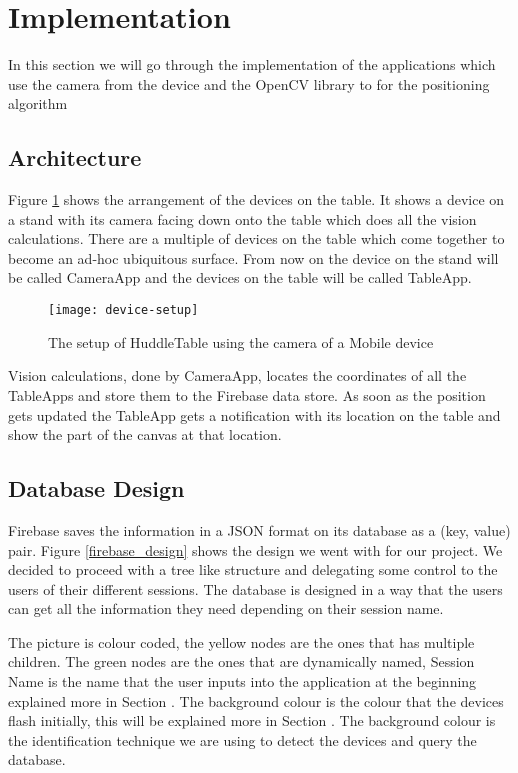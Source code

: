 \section{Implementation}
In this section we will go through the implementation of the applications which use the camera from the device and the OpenCV library to for the positioning algorithm 

\subsection{Architecture}

Figure \ref{fig:device-setup} shows the arrangement of the devices on the table. It shows a device on a stand with its camera facing down onto the table which does all the vision calculations. There are a multiple of devices on the table which come together to become an ad-hoc ubiquitous surface. From now on the device on the stand will be called CameraApp and the devices on the table will be called TableApp.
\begin{figure}[H]
\centering
\texttt{[image: device-setup]}
\caption{The setup of HuddleTable using the camera of a Mobile device}
\label{fig:device-setup}
\end{figure}


Vision calculations, done by CameraApp, locates the coordinates of all the TableApps and store them to the Firebase data store. As soon as the position gets updated the TableApp gets a notification with its location on the table and show the part of the canvas at that location.

\subsection{Database Design}

Firebase saves the information in a JSON format on its database as a (key, value) pair. Figure \ref{firebase_design} shows the design we went with for our project. We decided to proceed with a tree like structure and delegating some control to the users of their different sessions. The database is designed in a way that the users can get all the information they need depending on their session name. 

The picture is colour coded, the yellow nodes are the ones that has multiple children. The green nodes are the ones that are dynamically named, Session Name is the name that the user inputs into the application at the beginning explained more in Section . The background colour is the colour that the devices flash initially, this will be explained more in Section . The background colour is the identification technique we are using to detect the devices and query the database. 

